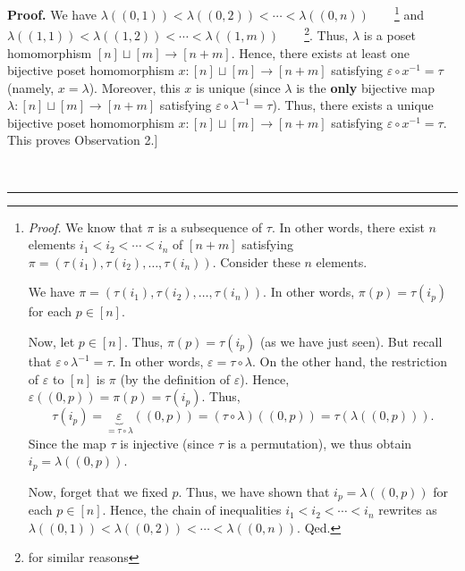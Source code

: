 \documentclass[numbers=enddot,12pt,final,onecolumn,notitlepage]{scrartcl}%
\theoremstyle{definition}
\newenvironment{proof}[1][Proof]{\noindent\textbf{#1.} }{\ \rule{0.5em}{0.5em}}
\newenvironment{verlong}{}{}
\begin{document}
\begin{proof}
\begin{verlong}
We have $\lambda\left(  \left(  0,1\right)  \right)  <\lambda\left(  \left(
0,2\right)  \right)  <\cdots<\lambda\left(  \left(  0,n\right)  \right)
$\ \ \ \ \footnote{\textit{Proof.} We know that $\pi$ is a subsequence of
$\tau$. In other words, there exist $n$ elements $i_{1}<i_{2}<\cdots<i_{n}$ of
$\left[  n+m\right]  $ satisfying $\pi=\left(  \tau\left(  i_{1}\right)
,\tau\left(  i_{2}\right)  ,\ldots,\tau\left(  i_{n}\right)  \right)  $.
Consider these $n$ elements.
\par
We have $\pi=\left(  \tau\left(  i_{1}\right)  ,\tau\left(  i_{2}\right)
,\ldots,\tau\left(  i_{n}\right)  \right)  $. In other words, $\pi\left(
p\right)  =\tau\left(  i_{p}\right)  $ for each $p\in\left[  n\right]  $.
\par
Now, let $p\in\left[  n\right]  $. Thus, $\pi\left(  p\right)  =\tau\left(
i_{p}\right)  $ (as we have just seen). But recall that $\varepsilon
\circ\lambda^{-1}=\tau$. In other words, $\varepsilon=\tau\circ\lambda$. On
the other hand, the restriction of $\varepsilon$ to $\left[  n\right]  $ is
$\pi$ (by the definition of $\varepsilon$). Hence, $\varepsilon\left(  \left(
0,p\right)  \right)  =\pi\left(  p\right)  =\tau\left(  i_{p}\right)  $. Thus,%
\[
\tau\left(  i_{p}\right)  =\underbrace{\varepsilon}_{=\tau\circ\lambda}\left(
\left(  0,p\right)  \right)  =\left(  \tau\circ\lambda\right)  \left(  \left(
0,p\right)  \right)  =\tau\left(  \lambda\left(  \left(  0,p\right)  \right)
\right)  .
\]
Since the map $\tau$ is injective (since $\tau$ is a permutation), we thus
obtain $i_{p}=\lambda\left(  \left(  0,p\right)  \right)  $.
\par
Now, forget that we fixed $p$. Thus, we have shown that $i_{p}=\lambda\left(
\left(  0,p\right)  \right)  $ for each $p\in\left[  n\right]  $. Hence, the
chain of inequalities $i_{1}<i_{2}<\cdots<i_{n}$ rewrites as $\lambda\left(
\left(  0,1\right)  \right)  <\lambda\left(  \left(  0,2\right)  \right)
<\cdots<\lambda\left(  \left(  0,n\right)  \right)  $. Qed.} and
$\lambda\left(  \left(  1,1\right)  \right)  <\lambda\left(  \left(
1,2\right)  \right)  <\cdots<\lambda\left(  \left(  1,m\right)  \right)
$\ \ \ \ \footnote{for similar reasons}. Thus, $\lambda$ is a poset
homomorphism $\left[  n\right]  \sqcup\left[  m\right]  \rightarrow\left[
n+m\right]  $. Hence, there exists at least one bijective poset homomorphism
$x:\left[  n\right]  \sqcup\left[  m\right]  \rightarrow\left[  n+m\right]  $
satisfying $\varepsilon\circ x^{-1}=\tau$ (namely, $x=\lambda$). Moreover,
this $x$ is unique (since $\lambda$ is the \textbf{only} bijective map
$\lambda:\left[  n\right]  \sqcup\left[  m\right]  \rightarrow\left[
n+m\right]  $ satisfying $\varepsilon\circ\lambda^{-1}=\tau$). Thus, there
exists a unique bijective poset homomorphism $x:\left[  n\right]
\sqcup\left[  m\right]  \rightarrow\left[  n+m\right]  $ satisfying
$\varepsilon\circ x^{-1}=\tau$. This proves Observation 2.]
\end{verlong}


\end{proof}
\end{document}
